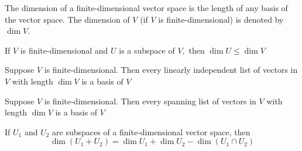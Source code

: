 
The dimension of a finite-dimensional vector space is the length of any basis of the vector space.
The dimension of $V$ (if $V$ is finite-dimensional) is denoted by $\operatorname{dim} V$. 

If $V$ is finite-dimensional and $U$ is a subspace of $V,$ then $\operatorname{dim} U \leq \operatorname{dim} V$

Suppose $V$ is finite-dimensional. Then every linearly independent list of vectors in $V$ with length $\operatorname{dim} V$ is a basis of $V$

Suppose $V$ is finite-dimensional. Then every spanning list of vectors in $V$ with length $\operatorname{dim} V$ is a basis of $V$

If $U_{1}$ and $U_{2}$ are subspaces of a finite-dimensional vector space, then
$$
\operatorname{dim}\left(U_{1}+U_{2}\right)=\operatorname{dim} U_{1}+\operatorname{dim} U_{2}-\operatorname{dim}\left(U_{1} \cap U_{2}\right)
$$
